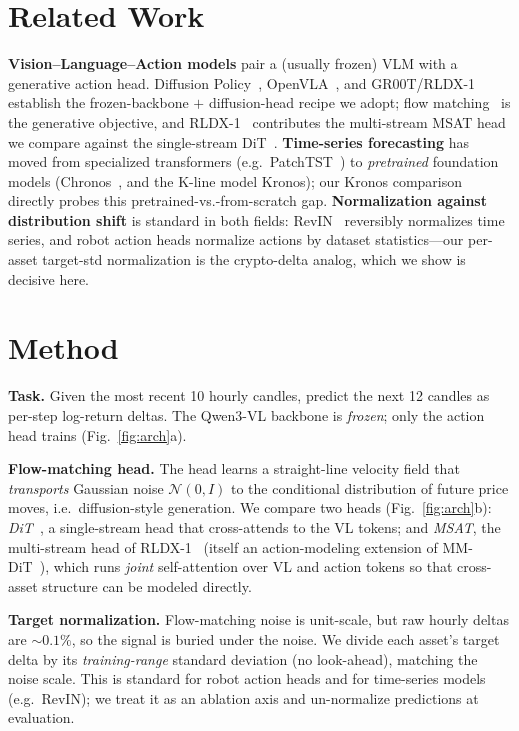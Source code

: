 \documentclass[10pt]{article}
\begin{document}
\section{Related Work}
\textbf{Vision--Language--Action models} pair a (usually frozen) VLM with a generative action
head. Diffusion Policy~\cite{chi2023}, OpenVLA~\cite{openvla}, and GR00T/RLDX-1~\cite{rldx1}
establish the frozen-backbone $+$ diffusion-head recipe we adopt; flow matching~\cite{lipman2023}
is the generative objective, and RLDX-1~\cite{rldx1} contributes the multi-stream MSAT head we
compare against the single-stream DiT~\cite{peebles2023}.
\textbf{Time-series forecasting} has moved from specialized transformers (e.g.\
PatchTST~\cite{patchtst}) to \emph{pretrained} foundation models (Chronos~\cite{chronos}, and the
K-line model Kronos); our Kronos comparison directly probes this pretrained-vs.-from-scratch gap.
\textbf{Normalization against distribution shift} is standard in both fields: RevIN~\cite{revin}
reversibly normalizes time series, and robot action heads normalize actions by dataset
statistics---our per-asset target-std normalization is the crypto-delta analog, which we show is
decisive here.

\section{Method}
\textbf{Task.} Given the most recent 10 hourly candles, predict the next 12 candles as per-step
log-return deltas. The Qwen3-VL backbone is \emph{frozen}; only the action head trains
(Fig.~\ref{fig:arch}a).

\noindent\textbf{Flow-matching head.} The head learns a straight-line velocity field that
\emph{transports} Gaussian noise $\mathcal{N}(0,I)$ to the conditional distribution of future
price moves, i.e.\ diffusion-style generation. We compare two heads (Fig.~\ref{fig:arch}b):
\emph{DiT}~\cite{peebles2023}, a single-stream head that cross-attends to the VL tokens; and
\emph{MSAT}, the multi-stream head of RLDX-1~\cite{rldx1} (itself an action-modeling extension of
MM-DiT~\cite{esser2024}), which runs \emph{joint} self-attention over VL and action tokens so
that cross-asset structure can be modeled directly.

\noindent\textbf{Target normalization.} Flow-matching noise is unit-scale, but raw hourly deltas
are ${\sim}0.1\%$, so the signal is buried under the noise. We divide each asset's target delta
by its \emph{training-range} standard deviation (no look-ahead), matching the noise scale. This
is standard for robot action heads and for time-series models (e.g.\ RevIN); we treat it as an
ablation axis and un-normalize predictions at evaluation.
\end{document}
